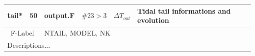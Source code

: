 \begin{longtable}{||p{0.42in}|p{0.25in}|p{0.6in}|p{0.6in}|p{0.4in}|p{2.3in}||}

tail*     & 50  & output.F   & $\#23 > 3$ &  $\Delta T_{out}$     & Tidal tail informations and evolution \\\hline
\multicolumn{2}{|c|}{ F-Label } & \multicolumn{4}{|p{4.4in}|}{ NTAIL, MODEL, NK  } \\\hline
\multicolumn{6}{|p{5.4in}|}{ Descriptions... } \\\hline\hline


\end{longtable}
